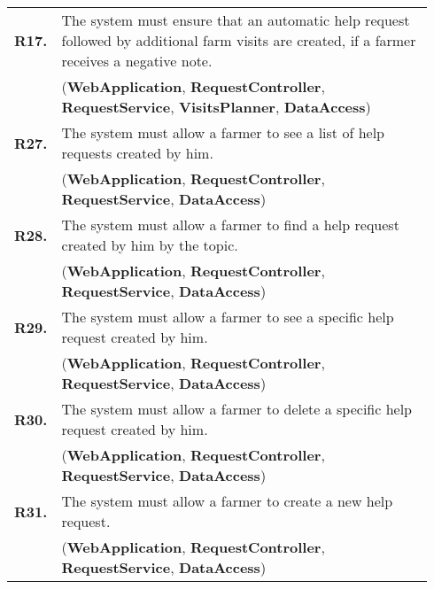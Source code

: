 \begin{longtable}{p{0.06\linewidth} p{0.88\linewidth}}
    \textbf{R17.} & The system must ensure that an automatic help request followed by additional farm visits are created, if a farmer receives a negative note.\\
    & (\textbf{WebApplication}, \textbf{RequestController}, \textbf{RequestService}, \textbf{VisitsPlanner}, \textbf{DataAccess})\\
	
	\textbf{R27.} & The system must allow a farmer to see a list of help requests created by him.\\
	& (\textbf{WebApplication}, \textbf{RequestController}, \textbf{RequestService}, \textbf{DataAccess})\\
	\textbf{R28.} & The system must allow a farmer to find a help request created by him by the topic.\\
	& (\textbf{WebApplication}, \textbf{RequestController}, \textbf{RequestService}, \textbf{DataAccess})\\
	\textbf{R29.} & The system must allow a farmer to see a specific help request created by him.\\
	& (\textbf{WebApplication}, \textbf{RequestController}, \textbf{RequestService}, \textbf{DataAccess})\\
	\textbf{R30.} & The system must allow a farmer to delete a specific help request created by him. \\
	& (\textbf{WebApplication}, \textbf{RequestController}, \textbf{RequestService}, \textbf{DataAccess})\\
	\textbf{R31.} & The system must allow a farmer to create a new help request.\\
	& (\textbf{WebApplication}, \textbf{RequestController}, \textbf{RequestService}, \textbf{DataAccess})\\
	

\end{longtable}
